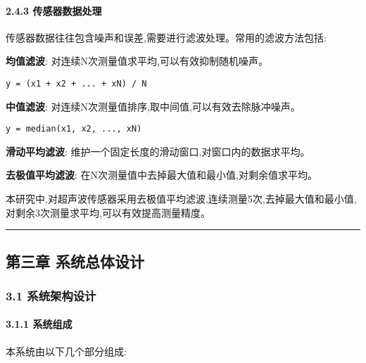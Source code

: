 \documentclass[
]{article}
\begin{document}
\hypertarget{ux4f20ux611fux5668ux6570ux636eux5904ux7406}{%
\paragraph{2.4.3
传感器数据处理}\label{ux4f20ux611fux5668ux6570ux636eux5904ux7406}}

传感器数据往往包含噪声和误差,需要进行滤波处理。常用的滤波方法包括:

\textbf{均值滤波}: 对连续N次测量值求平均,可以有效抑制随机噪声。

\begin{verbatim}
y = (x1 + x2 + ... + xN) / N
\end{verbatim}

\textbf{中值滤波}: 对连续N次测量值排序,取中间值,可以有效去除脉冲噪声。

\begin{verbatim}
y = median(x1, x2, ..., xN)
\end{verbatim}

\textbf{滑动平均滤波}: 维护一个固定长度的滑动窗口,对窗口内的数据求平均。

\textbf{去极值平均滤波}:
在N次测量值中去掉最大值和最小值,对剩余值求平均。

本研究中,对超声波传感器采用去极值平均滤波,连续测量5次,去掉最大值和最小值,对剩余3次测量求平均,可以有效提高测量精度。

\begin{center}\rule{0.5\linewidth}{0.5pt}\end{center}

\hypertarget{ux7b2cux4e09ux7ae0-ux7cfbux7edfux603bux4f53ux8bbeux8ba1}{%
\subsection{第三章
系统总体设计}\label{ux7b2cux4e09ux7ae0-ux7cfbux7edfux603bux4f53ux8bbeux8ba1}}

\hypertarget{ux7cfbux7edfux67b6ux6784ux8bbeux8ba1}{%
\subsubsection{3.1
系统架构设计}\label{ux7cfbux7edfux67b6ux6784ux8bbeux8ba1}}

\hypertarget{ux7cfbux7edfux7ec4ux6210}{%
\paragraph{3.1.1 系统组成}\label{ux7cfbux7edfux7ec4ux6210}}

本系统由以下几个部分组成:
\end{document}
